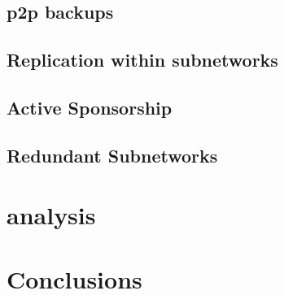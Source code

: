 \subsection{p2p backups}
\subsection{Replication within subnetworks}

\subsection{Active Sponsorship}

\subsection{Redundant Subnetworks}

\section{analysis}

\section{Conclusions}

